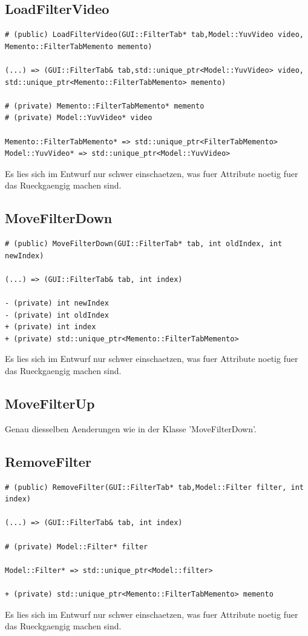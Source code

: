 \documentclass[parskip=full]{scrartcl}
\begin{document}
\subsection{LoadFilterVideo}
\begin{verbatim}
# (public) LoadFilterVideo(GUI::FilterTab* tab,Model::YuvVideo video,
Memento::FilterTabMemento memento)

(...) => (GUI::FilterTab& tab,std::unique_ptr<Model::YuvVideo> video,
std::unique_ptr<Memento::FilterTabMemento> memento)

# (private) Memento::FilterTabMemento* memento
# (private) Model::YuvVideo* video

Memento::FilterTabMemento* => std::unique_ptr<FilterTabMemento>
Model::YuvVideo* => std::unique_ptr<Model::YuvVideo>
\end{verbatim}
Es lies sich im Entwurf nur schwer einschaetzen, was fuer Attribute noetig fuer das Rueckgaengig machen sind.
\subsection{MoveFilterDown}
\begin{verbatim}
# (public) MoveFilterDown(GUI::FilterTab* tab, int oldIndex, int newIndex)

(...) => (GUI::FilterTab& tab, int index)

- (private) int newIndex
- (private) int oldIndex
+ (private) int index
+ (private) std::unique_ptr<Memento::FilterTabMemento>
\end{verbatim}
Es lies sich im Entwurf nur schwer einschaetzen, was fuer Attribute noetig fuer das Rueckgaengig machen sind.
\subsection{MoveFilterUp}
Genau diesselben Aenderungen wie in der Klasse 'MoveFilterDown'.
\subsection{RemoveFilter}
\begin{verbatim}
# (public) RemoveFilter(GUI::FilterTab* tab,Model::Filter filter, int index)

(...) => (GUI::FilterTab& tab, int index)

# (private) Model::Filter* filter

Model::Filter* => std::unique_ptr<Model::filter>

+ (private) std::unique_ptr<Memento::FilterTabMemento> memento
\end{verbatim}
Es lies sich im Entwurf nur schwer einschaetzen, was fuer Attribute noetig fuer das Rueckgaengig machen sind.
\end{document}

